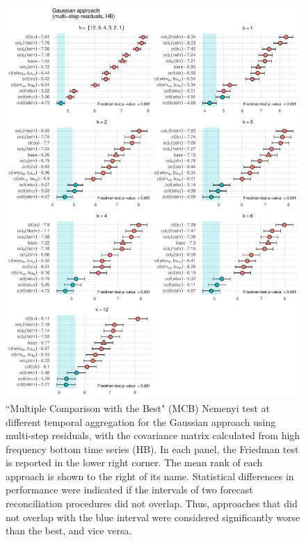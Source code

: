 \documentclass[a4paper,11pt]{article}
\theoremstyle{definition}
\begin{document}
\begin{figure}[p]
\centering
\includegraphics[width = \linewidth]{fig/VN525/hbsamh_more.pdf}
\caption{“Multiple Comparison with the Best" (MCB) Nemenyi test at different temporal aggregation for the Gaussian approach using multi-step residuals, with the covariance matrix calculated from high frequency bottom time series (HB). In each panel, the Friedman test is reported in the lower right corner. The mean rank of each approach is shown to the right of its name. Statistical differences in performance were indicated if the intervals of two forecast reconciliation procedures did not overlap. Thus, approaches that did not overlap with the blue interval were considered significantly worse than the best, and vice versa.}
\label{fig:vnmcb_h}
\end{figure}
\end{document}
